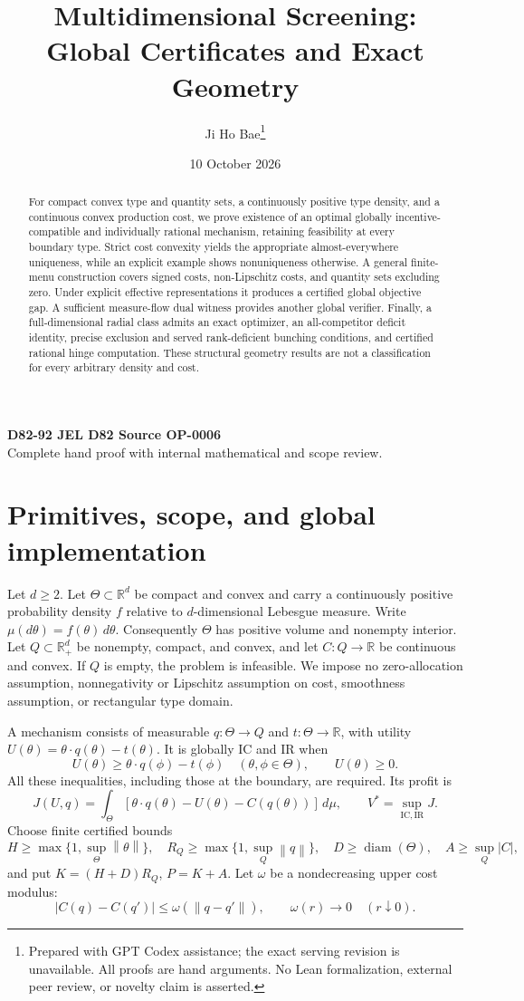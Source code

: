 \documentclass[11pt,a4paper]{article}
\title{Multidimensional Screening:\\Global Certificates and Exact Geometry}
\author{Ji Ho Bae\thanks{Prepared with GPT Codex assistance; the exact serving revision is unavailable. All proofs are hand arguments. No Lean formalization, external peer review, or novelty claim is asserted.}}
\date{10 October 2026}
\numberwithin{equation}{section}
\newcommand{\R}{\mathbb R}
\newcommand{\norm}[1]{\left\lVert #1\right\rVert}
\DeclareMathOperator{\diam}{diam}
\begin{document}
\maketitle
\begin{center}
\small\textbf{D82-92 \quad JEL D82 \quad Source OP-0006}\\
Complete hand proof with internal mathematical and scope review.
\end{center}
\begin{abstract}
For compact convex type and quantity sets, a continuously positive type
density, and a continuous convex production cost, we prove existence of
an optimal globally incentive-compatible and individually rational
mechanism, retaining feasibility at every boundary type. Strict cost
convexity yields the appropriate almost-everywhere uniqueness, while an
explicit example shows nonuniqueness otherwise. A general finite-menu
construction covers signed costs, non-Lipschitz costs, and quantity sets
excluding zero. Under explicit effective representations it produces a
certified global objective gap. A sufficient measure-flow dual witness
provides another global verifier. Finally, a full-dimensional radial
class admits an exact optimizer, an all-competitor deficit identity,
precise exclusion and served rank-deficient bunching conditions, and
certified rational hinge computation. These structural geometry results
are not a classification for every arbitrary density and cost.
\end{abstract}

\section{Primitives, scope, and global implementation}\label{sec:primitives}
Let \(d\ge2\). Let \(\Theta\subset\R^d\) be compact and convex and carry
a continuously positive probability density \(f\) relative to
\(d\)-dimensional Lebesgue measure. Write
\(\mu(d\theta)=f(\theta)\,d\theta\).
Consequently \(\Theta\) has positive volume and nonempty interior.
Let \(Q\subset\R_+^d\) be nonempty, compact, and convex, and let
\(C:Q\to\R\) be continuous and convex.
If \(Q\) is empty, the problem is infeasible.
We impose no zero-allocation assumption, nonnegativity or Lipschitz
assumption on cost, smoothness assumption, or rectangular type domain.

A mechanism consists of measurable \(q:\Theta\to Q\) and
\(t:\Theta\to\R\), with utility
\(U(\theta)=\theta\cdot q(\theta)-t(\theta)\).
It is globally IC and IR when
\[
 U(\theta)\ge\theta\cdot q(\phi)-t(\phi)
 \quad(\theta,\phi\in\Theta),\qquad U(\theta)\ge0.
\]
All these inequalities, including those at the boundary, are required.
Its profit is
\[
 J(U,q)=\int_\Theta[\theta\cdot q(\theta)-U(\theta)-C(q(\theta))]\,d\mu,
 \qquad V^*=\sup_{\mathrm{IC,IR}}J.
\]
Choose finite certified bounds
\[
 H\ge\max\{1,\sup_\Theta\norm\theta\},\quad
 R_Q\ge\max\{1,\sup_Q\norm q\},\quad
 D\ge\diam(\Theta),\quad A\ge\sup_Q|C|,
\]
and put \(K=(H+D)R_Q\), \(P=K+A\).
Let \(\omega\) be a nondecreasing upper cost modulus:
\[
 |C(q)-C(q')|\le\omega(\norm{q-q'}),\qquad
 \omega(r)\longrightarrow0\quad(r\downarrow0).
\]
\end{document}
